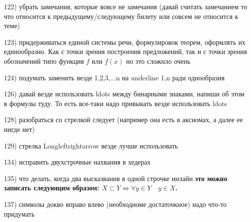122) убрать замечания, которые вовсе не замечания (давай считать замечанием то что относится к предыдущему/следующему билету или совсем не относится к теме)

123) придерживаться единой системы речи, формулировок теорем, оформлять их единообразно. Как с точки зрения построения предложений, так и с точки зрения обозначений типо функция $f$ или $f(x)$ но это сложнло очень

124) подумать заменить везде 1,2,3,...n на underline 1,n ради однообразия

126) давай везде использовать ldots между бинарными знаками, напиши об этом в формулы туду. То есть все-таки надо привыкать везде использовать ldots

128) разобраться со стрелкой следует (например она есть в аксиомах, а далее ее нигде нет)

129) стрелка Longleftrightarrow везде лучше использовать

134) исправить двухстрочные нахвания в хедерах

135) что делать, когда два высказвания в одной строчке инлайн   \textbf{это можно записать следующим образом: $X \subset Y \Longleftrightarrow \forall y\in Y\quad  y\in X$.}

137) символы докво вправо влево (необходиоме достаточкное) надо что-то придумать

